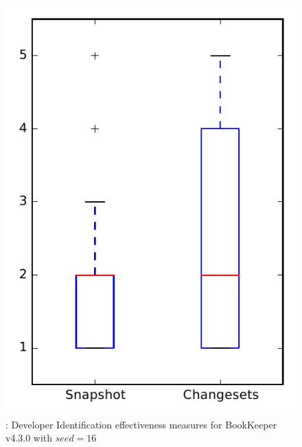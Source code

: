 
\begin{figure}
\centering
\includegraphics[height=0.4\textheight]{figures/dit_seed/rq1_bookkeeper_16}
\caption{\rtwo: Developer Identification effectiveness measures for BookKeeper v4.3.0 with $seed=16$}
\label{fig:dit_seed:rq1:bookkeeper}
\end{figure}
